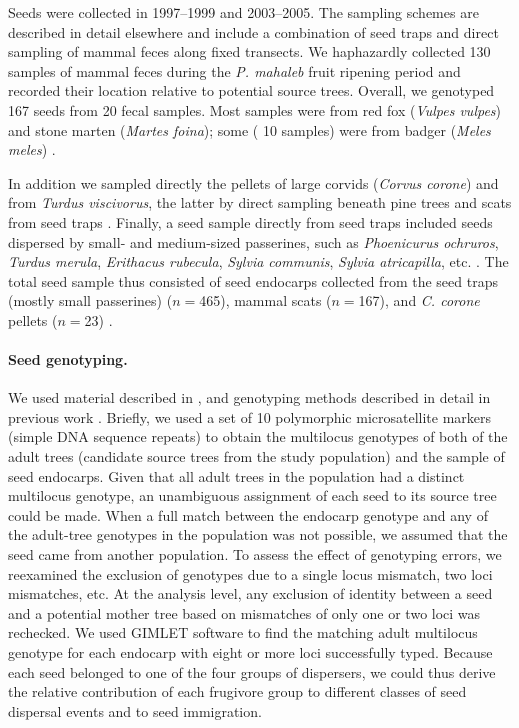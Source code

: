 \documentclass[a4paper, 12pt]{article}
\begin{document}
\begin{linenumbers}
Seeds were collected in 1997–1999 and 2003–2005. The sampling schemes are described in detail elsewhere \citep{Jordano:2007,Garcia:2009do} and include a combination of seed traps and direct sampling of mammal feces along fixed transects. We haphazardly collected 130 samples of mammal feces during the \textit{P. mahaleb} fruit ripening period and recorded their location relative to potential source trees. Overall, we genotyped 167 seeds from 20 fecal samples. Most samples were from red fox (\textit{Vulpes vulpes}) and stone marten (\textit{Martes foina}); some ( 10 samples) were from badger (\textit{Meles meles}) \citep{Jordano:2007}.

In addition we sampled directly the pellets of large corvids (\textit{Corvus corone}) and from \textit{Turdus viscivorus}, the latter by direct sampling beneath pine trees and scats from seed traps \citep[see ][ for details]{Jordano:2007}. Finally, a seed sample directly from seed traps included seeds dispersed by small- and medium-sized passerines, such as \textit{Phoenicurus ochruros}, \textit{Turdus merula}, \textit{Erithacus rubecula}, \textit{Sylvia communis}, \textit{Sylvia atricapilla}, etc. \citep{Jordano:2007}. The total seed sample thus consisted of seed endocarps collected from the seed traps (mostly small passerines) ($n= $465), mammal scats ($n= $167), and \textit{C. corone} pellets ($n= $23) \citep[see Table 1 in ][]{Jordano:2007}. 

\paragraph*{Seed genotyping.} 
We used material described in \citet{Jordano:2007}, and genotyping methods described in detail in previous work \citep{Godoy:2001,Garcia:2007he,Garcia:2009do}. Briefly, we used a set of 10 polymorphic microsatellite markers (simple DNA sequence repeats) \citep{Godoy:2001} to obtain the multilocus genotypes of both of the adult trees (candidate source trees from the study population) and the sample of seed endocarps. Given that all adult trees in the population had a distinct multilocus genotype, an unambiguous assignment of each seed to its source tree could be made. When a full match between the endocarp genotype and any of the adult-tree genotypes in the population was not possible, we assumed that the seed came from another population. To assess the effect of genotyping errors, we reexamined the exclusion of genotypes due to a single locus mismatch, two loci mismatches, etc. At the analysis level, any exclusion of identity between a seed and a potential mother tree based on mismatches of only one or two loci was rechecked. We used GIMLET software \citep{Valiere:2002fo} to find the matching adult multilocus genotype for each endocarp with eight or more loci successfully typed. Because each seed belonged to one of the four groups of dispersers, we could thus derive the relative contribution of each frugivore group to different classes of seed dispersal events and to seed immigration.


\end{linenumbers}
\end{document}
